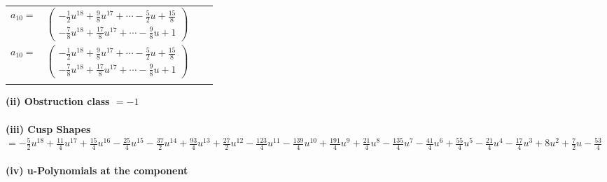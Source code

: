 \documentclass[1p]{elsarticle_modified}
\theoremstyle{definition}
\begin{document}
\begin{tabular}{m{7pt} m{180pt} m{7pt} m{180pt} }
\flushright $a_{10}=$&$\begin{pmatrix}-\frac{1}{2} u^{18}+\frac{9}{8} u^{17}+\cdots-\frac{5}{2} u+\frac{15}{8}\\-\frac{7}{8} u^{18}+\frac{17}{8} u^{17}+\cdots-\frac{9}{8} u+1\end{pmatrix}$\\ \flushright $a_{10}=$&$\begin{pmatrix}-\frac{1}{2} u^{18}+\frac{9}{8} u^{17}+\cdots-\frac{5}{2} u+\frac{15}{8}\\-\frac{7}{8} u^{18}+\frac{17}{8} u^{17}+\cdots-\frac{9}{8} u+1\end{pmatrix}$\\&\end{tabular}
\flushleft \textbf{(ii) Obstruction class $= -1$}\\~\\
\flushleft \textbf{(iii) Cusp Shapes $= -\frac{5}{2} u^{18}+\frac{11}{4} u^{17}+\frac{15}{4} u^{16}-\frac{25}{4} u^{15}-\frac{37}{2} u^{14}+\frac{93}{4} u^{13}+\frac{27}{2} u^{12}-\frac{123}{4} u^{11}-\frac{139}{4} u^{10}+\frac{191}{4} u^9+\frac{21}{4} u^8-\frac{135}{4} u^7-\frac{41}{4} u^6+\frac{55}{4} u^5-\frac{21}{4} u^4-\frac{17}{4} u^3+8 u^2+\frac{7}{2} u-\frac{53}{4}$}\\~\\
\newpage\renewcommand{\arraystretch}{1}
\flushleft \textbf{(iv) u-Polynomials at the component}\newline \\
\end{document}
